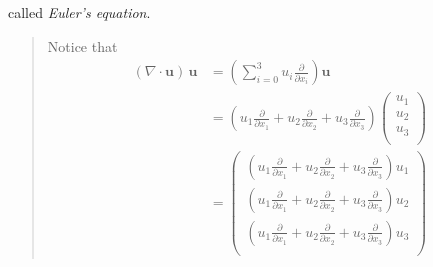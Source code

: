 called \textit{Euler's equation}.

\begin{quote}
	Notice that
\begin{equation}
\begin{aligned}
\left(\nabla\cdot \textbf{u}\right)\,\textbf{u}
&= \left(\sum_{i=0}^{3}u_i\frac{\partial}{\partial x_i}\right)\textbf{u}\\
&= \left(u_1\frac{\partial}{\partial x_1}
+u_2\frac{\partial}{\partial x_2}
+u_3\frac{\partial}{\partial x_3}\right)
\begin{pmatrix}u_1\\ u_2\\ u_3\\
\end{pmatrix}\\
&=\begin{pmatrix}
\left(u_1\frac{\partial}{\partial x_1}
+u_2\frac{\partial}{\partial x_2}
+u_3\frac{\partial}{\partial x_3}\right) u_1\\
\left(u_1\frac{\partial}{\partial x_1}
+u_2\frac{\partial}{\partial x_2}
+u_3\frac{\partial}{\partial x_3}\right) u_2\\
\left(u_1\frac{\partial}{\partial x_1}
+u_2\frac{\partial}{\partial x_2}
+u_3\frac{\partial}{\partial x_3}\right) u_3\\
\end{pmatrix}
\end{aligned}
\end{equation}

\end{quote}
